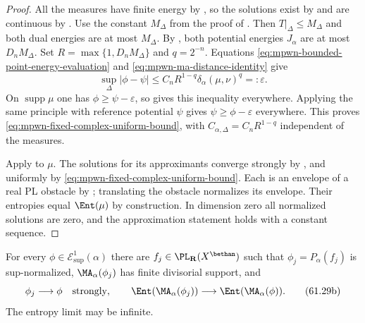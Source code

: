 \begin{proof}
All the measures have finite energy by , so the solutions exist by  and are continuous by . Use the constant $M_\Delta$ from the proof of . Then $T|_\Delta\leq M_\Delta$ and both dual energies are at most $M_\Delta$. By , both potential energies $J_\alpha$ are at most $D_nM_\Delta$. Set $R=\max\{1,D_nM_\Delta\}$ and $q=2^{-n}$. Equations \eqref{eq:mpwn-bounded-point-energy-evaluation} and \eqref{eq:mpwn-ma-distance-identity} give
\[
 \sup_\Delta|\phi-\psi|
       \leq C_nR^{1-q}\delta_\alpha(\mu,\nu)^q=:\varepsilon.
\]
On $\operatorname{supp}\mu$ one has $\phi\geq\psi-\varepsilon$, so  gives this inequality everywhere. Applying the same principle with reference potential $\psi$ gives $\psi\geq\phi-\varepsilon$ everywhere. This proves \eqref{eq:mpwn-fixed-complex-uniform-bound}, with $C_{\alpha,\Delta}=C_nR^{1-q}$ independent of the measures.

Apply  to $\mu$. The solutions for its approximants converge strongly by , and uniformly by \eqref{eq:mpwn-fixed-complex-uniform-bound}. Each is an envelope of a real PL obstacle by ; translating the obstacle normalizes its envelope. Their entropies equal $\Ent(\mu)$ by construction. In dimension zero all normalized solutions are zero, and the approximation statement holds with a constant sequence.
\end{proof}

\begin{corollary}\label{cor:mpwn-divisorial-entropy-density}
For every $\phi\in\mathcal E^1_{\sup}(\alpha)$ there are $f_j\in\PL_{\mathbf R}(X^{\bethan})$ such that $\phi_j=P_\alpha(f_j)$ is sup-normalized, $\MA_\alpha(\phi_j)$ has finite divisorial support, and
\[
 \phi_j\longrightarrow\phi\quad\text{strongly},\qquad
 \Ent(\MA_\alpha(\phi_j))
           \longrightarrow\Ent(\MA_\alpha(\phi)).
\tag{61.29b}\label{eq:mpwn-divisorial-entropy-density}
\]
The entropy limit may be infinite.
\end{corollary}

